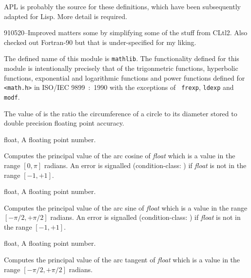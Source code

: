 \label{elementary-functions}
\begin{optPrivate}
APL is probably the source for these definitions, which have been
subsequently adapted for Lisp.  More detail is required.

910520--Improved matters some by simplifying some of the stuff from
CLtl2.  Also checked out Fortran-90 but that is under-specified for my
liking.
\end{optPrivate}
\begin{optDefinition}
The defined name of this module is {\tt mathlib}.  The functionality defined for
this module is intentionally precisely that of the trigonmetric functions,
hyperbolic functions, exponential and logarithmic functions and power functions
defined for {\tt <math.h>} in ISO/IEC 9899~:~1990 with the exceptions of {\tt
    frexp}, {\tt ldexp} and {\tt modf}.

%
\remarks%
The value of  is the ratio the circumference of a circle to its
diameter stored to double precision floating point accuracy.

%
\begin{genericargs}
    \item[float, \classref{float}] A floating point number.
\end{genericargs}
%
\result%
Computes the principal value of the arc cosine of {\em float} which is a value
in the range $[0,\pi]$ radians.  An error is signalled (condition-class:
) if {\em float}
is not in the range $[-1,+1]$.

%
\begin{genericargs}
    \item[float, \classref{float}] A floating point number.
\end{genericargs}
%
\result%
Computes the principal value of the arc sine of {\em float} which is a value in
the range $[-\pi/2,+\pi/2]$ radians.  An error is signalled (condition-class:
) if {\em float}
is not in the range $[-1,+1]$.

%
\begin{genericargs}
    \item[float, \classref{float}] A floating point number.
\end{genericargs}
%
\result%
Computes the principal value of the arc tangent of {\em float}
which is a value in the range $[-\pi/2,+\pi/2]$ radians.


\end{optDefinition}

